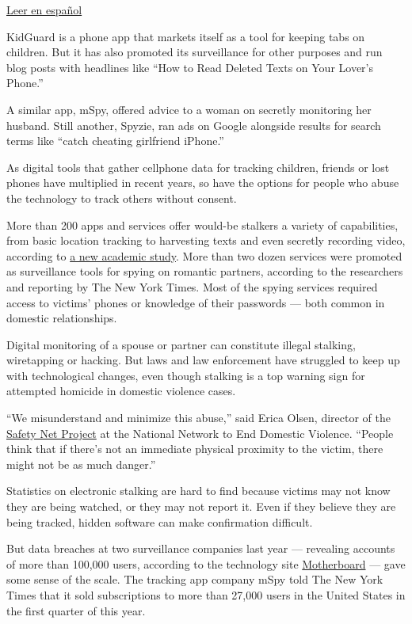 \href{https://www.nytimes.com/es/2018/05/24/espia-aplicacion-celular}{Leer
en español}

KidGuard is a phone app that markets itself as a tool for keeping tabs
on children. But it has also promoted its surveillance for other
purposes and run blog posts with headlines like ``How to Read Deleted
Texts on Your Lover's Phone.''

A similar app, mSpy, offered advice to a woman on secretly monitoring
her husband. Still another, Spyzie, ran ads on Google alongside results
for search terms like ``catch cheating girlfriend iPhone.''

As digital tools that gather cellphone data for tracking children,
friends or lost phones have multiplied in recent years, so have the
options for people who abuse the technology to track others without
consent.

More than 200 apps and services offer would-be stalkers a variety of
capabilities, from basic location tracking to harvesting texts and even
secretly recording video, according to
\href{https://www.ipvtechresearch.org/pubs/spyware.pdf}{a new academic
study}. More than two dozen services were promoted as surveillance tools
for spying on romantic partners, according to the researchers and
reporting by The New York Times. Most of the spying services required
access to victims' phones or knowledge of their passwords --- both
common in domestic relationships.

Digital monitoring of a spouse or partner can constitute illegal
stalking, wiretapping or hacking. But laws and law enforcement have
struggled to keep up with technological changes, even though stalking is
a top warning sign for attempted homicide in domestic violence cases.

``We misunderstand and minimize this abuse,'' said Erica Olsen, director
of the \href{https://www.techsafety.org/}{Safety Net Project} at the
National Network to End Domestic Violence. ``People think that if
there's not an immediate physical proximity to the victim, there might
not be as much danger.''

Statistics on electronic stalking are hard to find because victims may
not know they are being watched, or they may not report it. Even if they
believe they are being tracked, hidden software can make confirmation
difficult.

But data breaches at two surveillance companies last year --- revealing
accounts of more than 100,000 users, according to the technology site
\href{https://motherboard.vice.com/en_us/article/53vm7n/inside-stalkerware-surveillance-market-flexispy-retina-x}{Motherboard}
--- gave some sense of the scale. The tracking app company mSpy told The
New York Times that it sold subscriptions to more than 27,000 users in
the United States in the first quarter of this year.

